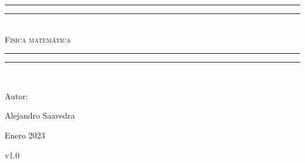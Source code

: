 \documentclass[letterpaper,12pt]{report}
\newlength{\drop}
\theoremstyle{definition}
\begin{document}
\begin{titlepage}
 \textheight
    \centering
    \vspace*{\baselineskip}
    \rule{\textwidth}{1.6pt}\vspace*{-\baselineskip}\vspace*{2pt}
    \rule{\textwidth}{0.4pt}\\[\baselineskip]
    {\scshape\Huge Física matemática} \\[0.2\baselineskip]
    \rule{\textwidth}{0.4pt}\vspace*{-\baselineskip}\vspace{3.2pt}
    \rule{\textwidth}{1.6pt}\\[\baselineskip]
    {\Large Autor: \par}
{\Large Alejandro Saavedra \par}
\vfill
{\large Enero 2023 \par}
{\large v1.0 \par}
\end{titlepage}

\tableofcontents







\nocite{*} %
\printbibliography[title={Referencias}]
\end{document}
